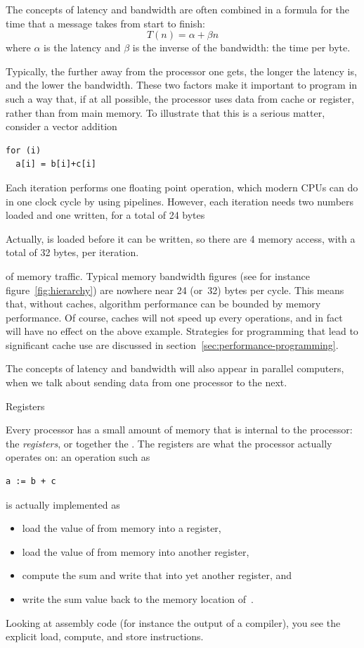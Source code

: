 The concepts of latency and bandwidth are often combined in a formula
for the time that a message takes from start to finish:
\[ T(n) = \alpha+\beta n \]
where $\alpha$ is the latency and $\beta$ is the inverse of the
bandwidth: the time per byte.

Typically, the further away from the processor one gets, the longer
the latency is, and the lower the bandwidth.
These two factors make it important to program in such a
way that, if at all possible, the processor uses data from cache or register,
rather than from main memory. To illustrate that this is a serious
matter, consider a vector addition
\begin{verbatim}
for (i)
  a[i] = b[i]+c[i]
\end{verbatim}
Each iteration performs one floating point operation, which modern
\acp{CPU} can do in one clock cycle by using pipelines. However, each
iteration needs two numbers loaded and one written, for a total of 24
bytes
\begin{footnoteenv}
  {Actually,  is loaded before it can be written,
so there are 4 memory access, with a total of 32 bytes, per
iteration.}
\end{footnoteenv}
of memory traffic. Typical memory bandwidth figures (see
for instance figure~\ref{fig:hierarchy}) are nowhere near 24 (or~32) bytes per
cycle. This means that, without caches, algorithm performance can be
bounded by memory performance. Of course, caches will not speed up
every operations, and in fact will have no effect on the above
example. Strategies for programming that lead to significant cache use
are discussed in section~\ref{sec:performance-programming}.

The concepts of latency and bandwidth will also appear in parallel
computers, when we talk about sending data from one processor to the
next.

 {Registers}
\label{sec:register}

Every processor has a small amount of memory that is internal to the
processor: the \emph{registers}, or together the
. The registers are what the processor
actually operates on: an operation such as 
\begin{verbatim}
a := b + c
\end{verbatim}
is actually implemented as 
\begin{itemize}
\item load the value of  from memory into a register,
\item load the value of  from memory into another register,
\item compute the sum and write that into yet another register, and
\item write the sum value back to the memory location of~.
\end{itemize}
Looking at assembly code (for instance the output of a compiler), you
see the explicit load, compute, and store instructions.

